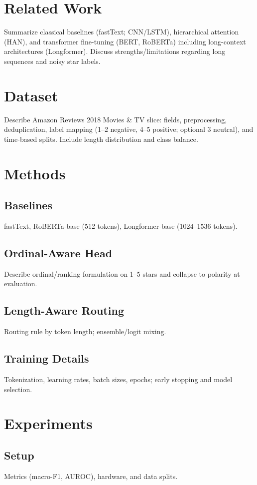 \documentclass[conference]{IEEEtran}
\begin{document}
\section{Related Work}
\label{sec:related}
Summarize classical baselines (fastText; CNN/LSTM), hierarchical attention (HAN), and transformer fine-tuning (BERT, RoBERTa) including long-context architectures (Longformer). Discuss strengths/limitations regarding long sequences and noisy star labels.

\section{Dataset}
\label{sec:dataset}
Describe Amazon Reviews 2018 Movies \& TV slice: fields, preprocessing, deduplication, label mapping (1--2 negative, 4--5 positive; optional 3 neutral), and time-based splits. Include length distribution and class balance.

\section{Methods}
\label{sec:methods}
\subsection{Baselines}
fastText, RoBERTa-base (512 tokens), Longformer-base (1024--1536 tokens).
\subsection{Ordinal-Aware Head}
Describe ordinal/ranking formulation on 1--5 stars and collapse to polarity at evaluation.
\subsection{Length-Aware Routing}
Routing rule by token length; ensemble/logit mixing.
\subsection{Training Details}
Tokenization, learning rates, batch sizes, epochs; early stopping and model selection.

\section{Experiments}
\label{sec:experiments}
\subsection{Setup}
Metrics (macro-F1, AUROC), hardware, and data splits.
\end{document}
